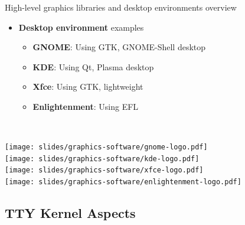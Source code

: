 \begin{frame}{High-level graphics libraries and desktop environments overview}
\begin{minipage}[b]{0.8\textwidth}
\begin{itemize}
  \textit{gives a consistent look and feel across the system}
  \item \textbf{Desktop environment} examples
    \begin{itemize}
    \item \textbf{GNOME}: Using GTK, GNOME-Shell desktop
    \item \textbf{KDE}: Using Qt, Plasma desktop
    \item \textbf{Xfce}: Using GTK, lightweight
    \item \textbf{Enlightenment}: Using EFL
    \end{itemize}
  \end{itemize}
  \vfill~
  \end{minipage}
  \begin{minipage}[b]{0.09\textwidth}
  \centering
  \texttt{[image: slides/graphics-software/gnome-logo.pdf]}\\
  \vspace{1em}
  \texttt{[image: slides/graphics-software/kde-logo.pdf]}\\
  \vspace{1em}
  \texttt{[image: slides/graphics-software/xfce-logo.pdf]}\\
  \vspace{0.5em}
  \texttt{[image: slides/graphics-software/enlightenment-logo.pdf]}
  \end{minipage}
\end{frame}

\subsection{TTY Kernel Aspects}

